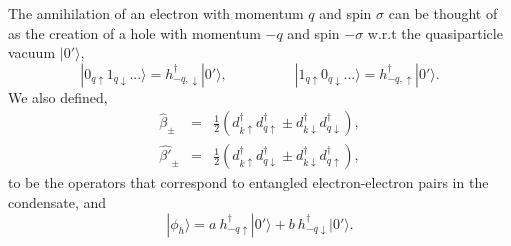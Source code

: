 \documentclass[10pt,letterpaper,aps,onecolumn,superscriptaddress,floatfix,notitlepage]{revtex4-1}
\begin{document}
	The annihilation of an electron with momentum $q$ and spin $\sigma$ can be thought of as the creation of a hole with momentum $-q$ and spin $-\sigma$ w.r.t the quasiparticle vacuum $|0'\rangle$,
	\begin{equation}|0_{q\uparrow}1_{q\downarrow}...\rangle =h^{\dagger}_{-q,\downarrow}|0'\rangle,\hspace{2cm}|1_{q\uparrow}0_{q\downarrow}...\rangle = h^{\dagger}_{-q,\uparrow}|0'\rangle.\end{equation}
	We also defined,  \begin{eqnarray}\label{eq:triplet}\hat{\beta}_{\pm} &=& \frac{1}{2}(d^{\dagger}_{k\uparrow}d^{\dagger}_{q\uparrow}\pm d^{\dagger}_{k\downarrow}d^{\dagger}_{q\downarrow}),\\\label{eq:singlet}\hat{\beta'}_{\pm} &=& \frac{1}{2}(d^{\dagger}_{k\uparrow}d^{\dagger}_{q\downarrow}\pm d^{\dagger}_{k\downarrow}d^{\dagger}_{q\uparrow}),\end{eqnarray} to be the operators that correspond to entangled electron-electron pairs in the condensate, and \begin{equation}|\phi_{h}\rangle = a~h_{-q\uparrow}^{\dagger}|0'\rangle+b~h_{-q\downarrow}^{\dagger}|0'\rangle.\end{equation}
	
\end{document}
